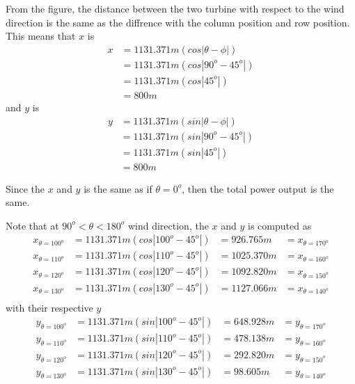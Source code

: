 
From the figure, the distance between the two turbine with respect to the wind direction is the same as the diffrence with the column position and row position. This means that $x$ is
	\begin{align*}
		x &= 1131.371m(cos|\theta-\phi|) \\
		  &= 1131.371m(cos|90^{o}-45^{o}|) \\
		  &= 1131.371m(cos|45^{o}|) \\
		  &= 800m	
	\end{align*}
and $y$ is 
	\begin{align*}
		y &= 1131.371m(sin|\theta-\phi|) \\
		  &= 1131.371m(sin|90^{o}-45^{o}|) \\
		  &= 1131.371m(sin|45^{o}|) \\
		  &= 800m	
	\end{align*}

Since the $x$ and $y$ is the same as if $\theta=0^{o}$, then the total power output is the same.


Note that at $90^{o}<\theta<180^{o}$ wind direction, the $x$ and $y$ is computed as 
	\begin{align*}
		x_{\theta=100^{o}} &= 1131.371m(cos|100^{o}-45^{o}|) &= 926.765m &= x_{\theta=170^{o}} \\
	 	x_{\theta=110^{o}} &= 1131.371m(cos|110^{o}-45^{o}|) &= 1025.370m &= x_{\theta=160^{o}} \\
		x_{\theta=120^{o}} &= 1131.371m(cos|120^{o}-45^{o}|) &= 1092.820m &= x_{\theta=150^{o}} \\
		x_{\theta=130^{o}} &= 1131.371m(cos|130^{o}-45^{o}|) &= 1127.066m &= x_{\theta=140^{o}} \\
	\end{align*}
with their respective $y$ 
	\begin{align*}
		y_{\theta=100^{o}} &= 1131.371m(sin|100^{o}-45^{o}|) &= 648.928m &= y_{\theta=170^{o}} \\
	 	y_{\theta=110^{o}} &= 1131.371m(sin|110^{o}-45^{o}|) &= 478.138m &= y_{\theta=160^{o}} \\
		y_{\theta=120^{o}} &= 1131.371m(sin|120^{o}-45^{o}|) &= 292.820m &= y_{\theta=150^{o}} \\
		y_{\theta=130^{o}} &= 1131.371m(sin|130^{o}-45^{o}|) &=  98.605m &= y_{\theta=140^{o}} 
	\end{align*}

